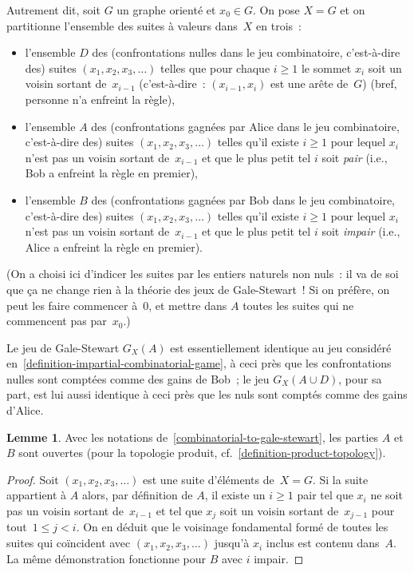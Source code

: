 \documentclass[12pt,a4paper]{article}
\theoremstyle{definition}
\newtheorem{lem}[comcnt]{Lemme}
\begin{document}
Autrement dit, soit $G$ un graphe orienté et $x_0 \in G$.  On pose $X
= G$ et on partitionne l'ensemble des suites à valeurs dans $X$ en
trois :
\begin{itemize}
\item l'ensemble $D$ des (confrontations nulles dans le jeu
  combinatoire, c'est-à-dire des) suites $(x_1,x_2,x_3,\ldots)$ telles
  que pour chaque $i \geq 1$ le sommet $x_i$ soit un voisin sortant
  de $x_{i-1}$ (c'est-à-dire : $(x_{i-1},x_i)$ est une arête de $G$)
  (bref, personne n'a enfreint la règle),
\item l'ensemble $A$ des (confrontations gagnées par Alice dans le jeu
  combinatoire, c'est-à-dire des) suites $(x_1,x_2,x_3,\ldots)$ telles
  qu'il existe $i \geq 1$ pour lequel $x_i$ n'est pas un voisin
  sortant de $x_{i-1}$ et que le plus petit tel $i$ soit \emph{pair}
  (i.e., Bob a enfreint la règle en premier),
\item l'ensemble $B$ des (confrontations gagnées par Bob dans le jeu
  combinatoire, c'est-à-dire des) suites $(x_1,x_2,x_3,\ldots)$ telles
  qu'il existe $i \geq 1$ pour lequel $x_i$ n'est pas un voisin
  sortant de $x_{i-1}$ et que le plus petit tel $i$ soit \emph{impair}
  (i.e., Alice a enfreint la règle en premier).
\end{itemize}
(On a choisi ici d'indicer les suites par les entiers naturels non
nuls : il va de soi que ça ne change rien à la théorie des jeux de
Gale-Stewart !  Si on préfère, on peut les faire commencer à $0$, et
mettre dans $A$ toutes les suites qui ne commencent pas par $x_0$.)

Le jeu de Gale-Stewart $G_X(A)$ est essentiellement identique au jeu
considéré en \ref{definition-impartial-combinatorial-game}, à
ceci près que les confrontations nulles sont comptées comme des gains
de Bob ; le jeu $G_X(A \cup D)$, pour sa part, est lui aussi identique
à ceci près que les nuls sont comptés comme des gains d'Alice.

\begin{lem}\label{openness-of-combinatorial-to-gale-stewart}
Avec les notations de \ref{combinatorial-to-gale-stewart}, les parties
$A$ et $B$ sont ouvertes (pour la topologie produit,
cf. \ref{definition-product-topology}).
\end{lem}
\begin{proof}
Soit $(x_1,x_2,x_3,\ldots)$ est une suite d'éléments de $X = G$.  Si
la suite appartient à $A$ alors, par définition de $A$, il existe un
$i\geq 1$ pair tel que $x_i$ ne soit pas un voisin sortant
de $x_{i-1}$ et tel que $x_j$ soit un voisin sortant de $x_{j-1}$ pour
tout $1\leq j<i$.  On en déduit que le voisinage fondamental formé de
toutes les suites qui coïncident avec $(x_1,x_2,x_3,\ldots)$ jusqu'à
$x_i$ inclus est contenu dans $A$.  La même démonstration fonctionne
pour $B$ avec $i$ impair.
\end{proof}
\end{document}
